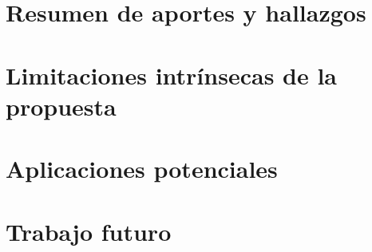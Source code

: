 \begin{conclusions}

\section{Resumen de aportes y hallazgos}
\section{Limitaciones intrínsecas de la propuesta}
\section{Aplicaciones potenciales}
\section{Trabajo futuro}

\end{conclusions}
